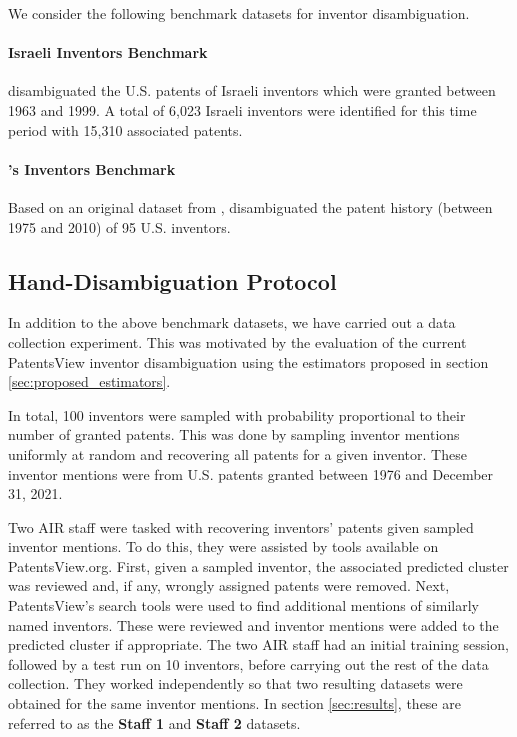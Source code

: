 \documentclass[fontsize=11pt]{article}
\newcommand{\ob}[1]{{\color{purple}#1}}
\theoremstyle{definition}
\begin{document}
We consider the following benchmark datasets for inventor disambiguation.

\paragraph{Israeli Inventors Benchmark}
\cite{trajtenberg2008identification} disambiguated the U.S. patents of Israeli inventors which were granted between 1963 and 1999. A total of 6,023 Israeli inventors were identified for this time period with 15,310 associated patents.

\paragraph{\cite{Li2014}'s Inventors Benchmark}

Based on an original dataset from \cite{gu2008march}, \cite{Li2014} disambiguated the patent history (between 1975 and 2010) of 95 U.S. inventors.



\subsection{Hand-Disambiguation Protocol}\label{sec:hand-disambiguation}

In addition to the above benchmark datasets, {we have carried out a data collection experiment. This was motivated by the evaluation of the current PatentsView inventor disambiguation using the estimators proposed in section \ref{sec:proposed_estimators}.}

In total, 100 inventors were sampled with probability proportional to their number of granted patents. This was done by sampling inventor mentions uniformly at random and recovering all patents for a given inventor. These inventor mentions were from U.S. patents granted between 1976 and December 31, 2021.

Two AIR staff were tasked with recovering inventors' patents given sampled inventor mentions. To do this, they were assisted by tools available on PatentsView.org. First, given a sampled inventor, the associated predicted cluster was reviewed \ob{and, if any, wrongly} assigned patents were removed. Next, PatentsView's search tools were used to find additional mentions of similarly named inventors. These were reviewed \ob{and inventor mentions were added} to the predicted cluster if appropriate. The two AIR staff had an initial training session, followed by a test run on 10 inventors, before carrying out the rest of the data collection. They worked independently so that two resulting datasets were obtained for the same inventor mentions. In section \ref{sec:results}, these are referred to as the \textbf{Staff 1} and \textbf{Staff 2} datasets.
\end{document}
